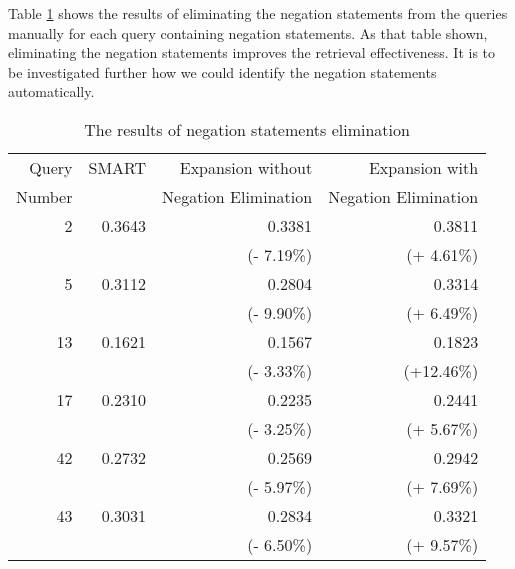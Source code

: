 Table \ref{tab:negation} shows the results of eliminating the negation statements from the queries manually for each query containing negation statements. As that table shown, eliminating the negation statements improves the retrieval effectiveness.
It is to be investigated further how we could identify  the negation statements automatically.


\begin{table}[hbpt]
  \begin{center} 
    \caption{The results of negation statements elimination}
   \vspace{3mm}
   \begin{tabular}{|r|r|r|r|} \hline
Query & SMART & Expansion without &  Expansion with  \\ 
Number &      & Negation Elimination & Negation Elimination \\ \hline
2 & 0.3643 & 0.3381  & 0.3811 \\ 
         &          &(- 7.19\%) &  (+ 4.61\%) \\ \hline 
5 & 0.3112 & 0.2804  & 0.3314\\ 
         &          &(- 9.90\%) &  (+ 6.49\%) \\ \hline 
13 & 0.1621 & 0.1567  & 0.1823\\ 
         &          &(- 3.33\%) &  (+12.46\%) \\ \hline 
17 & 0.2310 & 0.2235  & 0.2441 \\ 
         &          &(- 3.25\%) &  (+ 5.67\%) \\ \hline 
42 & 0.2732 & 0.2569  & 0.2942 \\ 
         &          &(- 5.97\%) &  (+ 7.69\%) \\ \hline 
43 & 0.3031 & 0.2834  & 0.3321 \\ 
         &          &(- 6.50\%) &  (+ 9.57\%) \\ \hline 
    \end{tabular}
   \label{tab:negation}
  \end{center}
\end{table}
\normalsize


